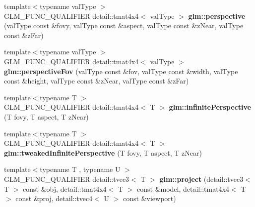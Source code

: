\begin{DoxyCompactItemize}
\item 
\hypertarget{namespaceglm_ab1ca9ec6ed391988cbf68b450ff8db8e}{{\footnotesize template$<$typename val\-Type $>$ }\\\-G\-L\-M\-\_\-\-F\-U\-N\-C\-\_\-\-Q\-U\-A\-L\-I\-F\-I\-E\-R \*
detail\-::tmat4x4$<$ val\-Type $>$ {\bfseries glm\-::perspective} (val\-Type const \&fovy, val\-Type const \&aspect, val\-Type const \&z\-Near, val\-Type const \&z\-Far)}\label{namespaceglm_ab1ca9ec6ed391988cbf68b450ff8db8e}

\item 
\hypertarget{namespaceglm_a1b723fb10bf246f4eed15aecec957093}{{\footnotesize template$<$typename val\-Type $>$ }\\\-G\-L\-M\-\_\-\-F\-U\-N\-C\-\_\-\-Q\-U\-A\-L\-I\-F\-I\-E\-R \*
detail\-::tmat4x4$<$ val\-Type $>$ {\bfseries glm\-::perspective\-Fov} (val\-Type const \&fov, val\-Type const \&width, val\-Type const \&height, val\-Type const \&z\-Near, val\-Type const \&z\-Far)}\label{namespaceglm_a1b723fb10bf246f4eed15aecec957093}

\item 
\hypertarget{namespaceglm_a26c8a8eb3ec23e831caad0723f4bc9d9}{{\footnotesize template$<$typename T $>$ }\\\-G\-L\-M\-\_\-\-F\-U\-N\-C\-\_\-\-Q\-U\-A\-L\-I\-F\-I\-E\-R \*
detail\-::tmat4x4$<$ \-T $>$ {\bfseries glm\-::infinite\-Perspective} (\-T fovy, \-T aspect, \-T z\-Near)}\label{namespaceglm_a26c8a8eb3ec23e831caad0723f4bc9d9}

\item 
\hypertarget{namespaceglm_ac3ee6e7dc730c43563c24cc7f8754dc4}{{\footnotesize template$<$typename T $>$ }\\\-G\-L\-M\-\_\-\-F\-U\-N\-C\-\_\-\-Q\-U\-A\-L\-I\-F\-I\-E\-R \*
detail\-::tmat4x4$<$ \-T $>$ {\bfseries glm\-::tweaked\-Infinite\-Perspective} (\-T fovy, \-T aspect, \-T z\-Near)}\label{namespaceglm_ac3ee6e7dc730c43563c24cc7f8754dc4}

\item 
\hypertarget{namespaceglm_a189c3ac8e8a1e7e6b1cc0ff09af35816}{{\footnotesize template$<$typename T , typename U $>$ }\\\-G\-L\-M\-\_\-\-F\-U\-N\-C\-\_\-\-Q\-U\-A\-L\-I\-F\-I\-E\-R \*
detail\-::tvec3$<$ \-T $>$ {\bfseries glm\-::project} (detail\-::tvec3$<$ \-T $>$ const \&obj, detail\-::tmat4x4$<$ \-T $>$ const \&model, detail\-::tmat4x4$<$ \-T $>$ const \&proj, detail\-::tvec4$<$ \-U $>$ const \&viewport)}\label{namespaceglm_a189c3ac8e8a1e7e6b1cc0ff09af35816}


\end{DoxyCompactItemize}
